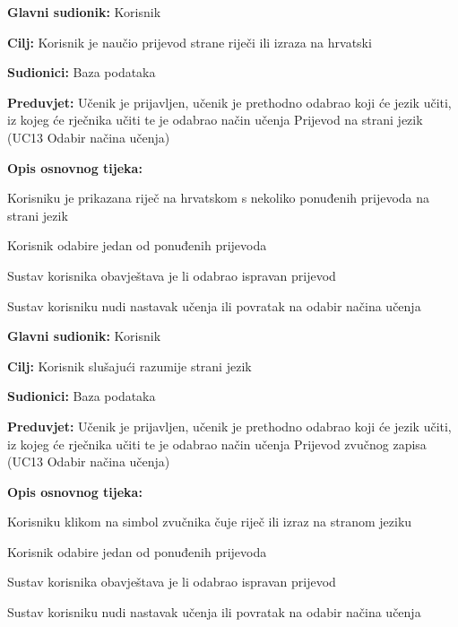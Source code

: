 \noindent {}
\begin{packed_item}

	\item \textbf{Glavni sudionik: } Korisnik
	\item \textbf{Cilj: } Korisnik je naučio prijevod strane riječi ili izraza na hrvatski
	\item \textbf{Sudionici: } Baza podataka
	\item \textbf{Preduvjet: } Učenik je prijavljen, učenik je prethodno odabrao koji će jezik učiti, iz kojeg će rječnika učiti te je odabrao način učenja Prijevod na strani jezik (UC13 Odabir načina učenja)
	\item  \textbf{Opis osnovnog tijeka:} 
	
	\item[] \begin{packed_enum}
		
		\item Korisniku je prikazana riječ na hrvatskom s nekoliko ponuđenih prijevoda na strani jezik
		\item Korisnik odabire jedan od ponuđenih prijevoda
		\item Sustav korisnika obavještava je li odabrao ispravan prijevod
		\item Sustav korisniku nudi nastavak učenja ili povratak na odabir načina učenja

	\end{packed_enum}

\end{packed_item}


\noindent {}
\begin{packed_item}

	\item \textbf{Glavni sudionik: } Korisnik
	\item \textbf{Cilj: } Korisnik slušajući razumije strani jezik
	\item \textbf{Sudionici: } Baza podataka
	\item \textbf{Preduvjet: } Učenik je prijavljen, učenik je prethodno odabrao koji će jezik učiti, iz kojeg će rječnika učiti te je odabrao način učenja Prijevod zvučnog zapisa (UC13 Odabir načina učenja)
	\item  \textbf{Opis osnovnog tijeka:} 
	
	\item[] \begin{packed_enum}

		\item Korisniku klikom na simbol zvučnika čuje riječ ili izraz na stranom jeziku
		\item Korisnik odabire jedan od ponuđenih prijevoda 
		\item Sustav korisnika obavještava je li odabrao ispravan prijevod
		\item Sustav korisniku nudi nastavak učenja ili povratak na odabir načina učenja

	\end{packed_enum}

\end{packed_item}


